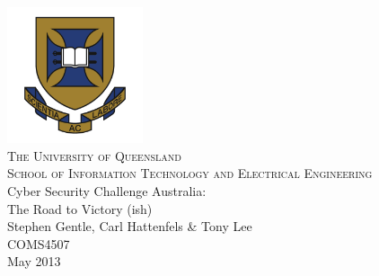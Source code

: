 \documentclass[11pt,a4paper,oneside]{book}
\begin{document}
\frontmatter

\begin{titlepage}
\begin{center}
\includegraphics[width=0.3\textwidth]{images/UQlogo}\\[0.3cm]

\textsc{\LARGE The University of Queensland}\\[0.4cm]

\textsc{\Large School of Information Technology and Electrical Engineering}\\[2cm]

{\huge Cyber Security Challenge Australia:\\The Road to Victory (ish)}\\[1.8cm]

{\Large Stephen Gentle, Carl Hattenfels \& Tony Lee}\\[1.5cm]
{\large COMS4507}\\[0.5cm]
{\large May 2013}\\[5.4cm]

\end{center}

\end{titlepage}

\cleardoublepage



\tableofcontents

\mainmatter











\clearpage
{}

\end{document}
